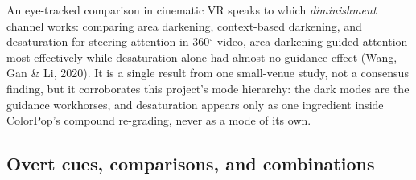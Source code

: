 An eye-tracked comparison in cinematic VR speaks to which \textit{diminishment} channel works: comparing
area darkening, context-based darkening, and desaturation for steering attention in 360$^{\circ}$ video, area
darkening guided attention most effectively while desaturation alone had almost no guidance effect
(Wang, Gan \& Li, 2020). It is a single result from one small-venue study, not a consensus finding,
but it corroborates this project's mode hierarchy: the dark modes are the guidance workhorses, and
desaturation appears only as one ingredient inside ColorPop's compound re-grading, never as a mode of
its own.

\subsection{Overt cues, comparisons, and combinations}

